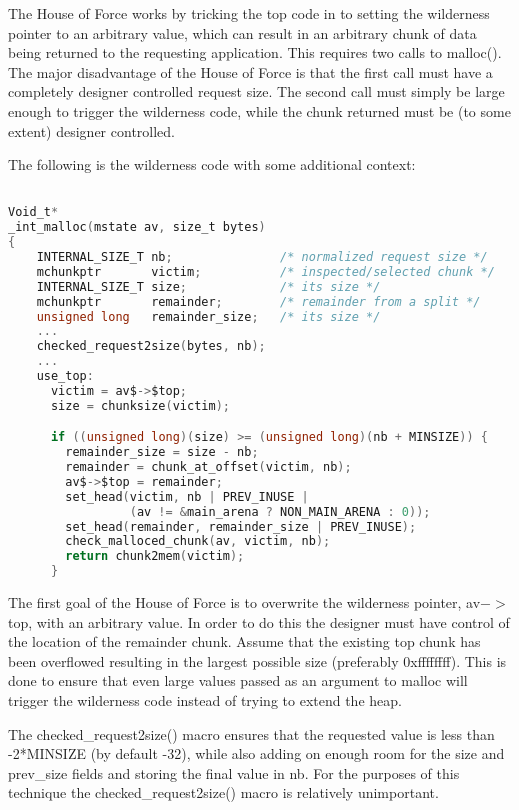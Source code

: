 \documentclass[12pt]{article}
\begin{document}
The House of Force works by tricking the top code in to setting the
wilderness pointer to an arbitrary value, which can result in an
arbitrary chunk of data being returned to the requesting
application. This requires two calls to malloc(). The major
disadvantage of the House of Force is that the first call must have
a completely designer controlled request size. The second call must
simply be large enough to trigger the wilderness code, while the
chunk returned must be (to some extent) designer controlled.

The following is the wilderness code with some additional context:
\begin{lstlisting}[language=C]

Void_t*
_int_malloc(mstate av, size_t bytes)
{
    INTERNAL_SIZE_T nb;               /* normalized request size */
    mchunkptr       victim;           /* inspected/selected chunk */
    INTERNAL_SIZE_T size;             /* its size */
    mchunkptr       remainder;        /* remainder from a split */
    unsigned long   remainder_size;   /* its size */
    ...
    checked_request2size(bytes, nb);
    ...
    use_top:
      victim = av$->$top;
      size = chunksize(victim);

      if ((unsigned long)(size) >= (unsigned long)(nb + MINSIZE)) {
        remainder_size = size - nb;
        remainder = chunk_at_offset(victim, nb);
        av$->$top = remainder;
        set_head(victim, nb | PREV_INUSE |
                 (av != &main_arena ? NON_MAIN_ARENA : 0));
        set_head(remainder, remainder_size | PREV_INUSE);
        check_malloced_chunk(av, victim, nb);
        return chunk2mem(victim);
      }
\end{lstlisting}
The first goal of the House of Force is to overwrite the wilderness
pointer, av$->$top, with an arbitrary value. In order to do this the
designer must have control of the location of the remainder chunk.
Assume that the existing top chunk has been overflowed resulting in
the largest possible size (preferably 0xffffffff). This is done to
ensure that even large values passed as an argument to malloc will
trigger the wilderness code instead of trying to extend the heap.
\newline


The checked\_request2size() macro ensures that the requested value
is less than -2*MINSIZE (by default -32), while also adding on
enough room for the size and prev\_size fields and storing the final
value in nb. For the purposes of this technique the
checked\_request2size() macro is relatively unimportant.
\newline
\end{document}
